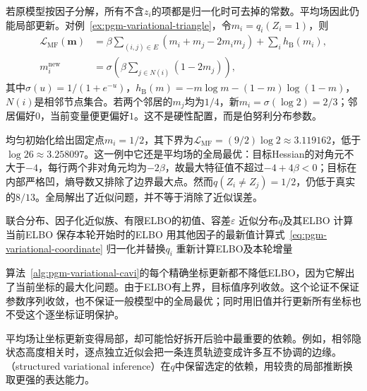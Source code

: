 若原模型按因子分解，所有不含$z_i$的项都是归一化时可去掉的常数。平均场因此仍能局部更新。对例~\ref{ex:pgm-variational-triangle}，令$m_i=q_i(Z_i=1)$，则
\begin{equation}
  \begin{aligned}
    \mathcal L_{\mathrm{MF}}(\bm m)
      &=\beta\sum_{(i,j)\in E}
           (m_i+m_j-2m_im_j)+\sum_i h_{\mathrm B}(m_i),\\
    m_i^{\mathrm{new}}
      &=\sigma\left(\beta\sum_{j\in N(i)}(1-2m_j)\right),
  \end{aligned}
  \label{eq:pgm-variational-triangle-mf}
\end{equation}
其中$\sigma(u)=1/(1+e^{-u})$，$h_{\mathrm B}(m)=-m\log m-(1-m)\log(1-m)$，$N(i)$是相邻节点集合。若两个邻居的$m_j$均为$1/4$，新$m_i=\sigma(\log2)=2/3$；邻居偏好$0$，当前变量便更偏好$1$。这不是硬性配置，而是伯努利分布参数。

均匀初始化给出固定点$m_i=1/2$，其下界为$\mathcal L_{\mathrm{MF}}=(9/2)\log2\approx3.119162$，低于$\log26\approx3.258097$。这一例中它还是平均场的全局最优：目标Hessian的对角元不大于$-4$，每行两个非对角元均为$-2\beta$，故最大特征值不超过$-4+4\beta<0$；目标在内部严格凹，熵导数又排除了边界最大点。然而$q(Z_i\ne Z_j)=1/2$，仍低于真实的$8/13$。全局解出了近似问题，并不等于消除了近似误差。

\begin{algorithm}[循环坐标平均场]
  \label{alg:pgm-variational-cavi}
  \begin{algorithmic}[1]
    \Require 联合分布、因子化近似族、有限ELBO的初值、容差$\varepsilon$
    \Ensure 近似分布$q$及其ELBO
    \State 计算当前ELBO
    \Repeat
      \State 保存本轮开始时的ELBO
        \State 用其他因子的最新值计算式~\eqref{eq:pgm-variational-coordinate}
        \State 归一化并替换$q_i$
      \EndFor
      \State 重新计算ELBO及本轮增量
  \end{algorithmic}
\end{algorithm}

算法~\ref{alg:pgm-variational-cavi}的每个精确坐标更新都不降低ELBO，因为它解出了当前坐标的最大化问题。由于ELBO有上界，目标值序列收敛。这个论证不保证参数序列收敛，也不保证一般模型中的全局最优；同时用旧值并行更新所有坐标也不受这个逐坐标证明保护。

平均场让坐标更新变得局部，却可能恰好拆开后验中最重要的依赖。例如，相邻隐状态高度相关时，逐点独立近似会把一条连贯轨迹变成许多互不协调的边缘。（structured variational inference）在$q$中保留选定的依赖，用较贵的局部推断换取更强的表达能力。
\label{sec:pgm-variational-structured}

